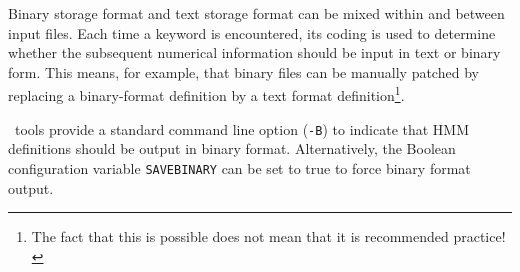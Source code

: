 Binary storage format and text storage format can be mixed
within and between input files.  Each time a keyword is
encountered, its coding is used to determine whether the
subsequent numerical information should be input in text
or binary form.  This means, for example, that binary
files can be manually patched by replacing a binary-format
definition by a text format definition\footnote{The fact that
this is possible does not mean that it is recommended practice!}.

\HTK\ tools provide a standard command line option (\texttt{-B}) to indicate
that HMM definitions should be output in binary format.
Alternatively, the Boolean configuration 
variable \texttt{SAVEBINARY} can be set to true to
force binary format output.




